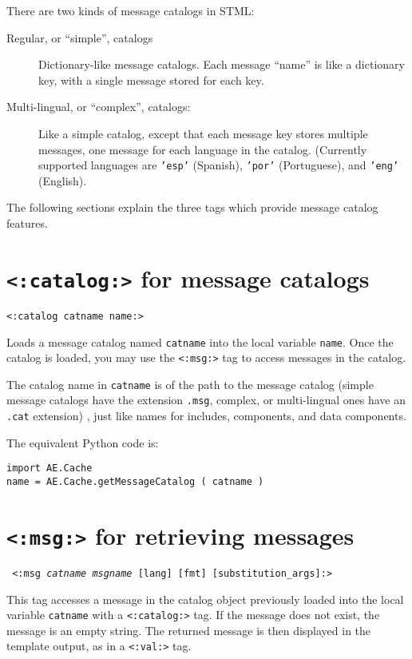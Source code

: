 \documentclass{manual}
\begin{document}
There are two kinds of message catalogs in STML:

\begin{description}
\item[Regular, or ``simple'', catalogs] Dictionary-like
message catalogs. Each message ``name'' is like a dictionary
key, with a single message stored for each key.

\item[Multi-lingual, or ``complex'', catalogs:] Like a
simple catalog, except that each message key stores
multiple messages, one message for each language in the
catalog. (Currently supported languages are \texttt{'esp'} (Spanish),
\texttt{'por'} (Portuguese), and \texttt{'eng'} (English). 
\end{description}

The following sections explain the three tags which
provide message catalog features.


\section{\texttt{<:catalog:>} for message catalogs}
\label{tagcatalog}

\texttt{<:catalog catname name:>}

Loads a  message catalog 
named \texttt{catname} into the local variable 
\texttt{name}. Once the catalog is loaded, you may
use the \texttt{<:msg:>} 
tag to access messages in the catalog.

The catalog name in \texttt{catname} is of the path to the message
catalog (simple message catalogs have the extension \texttt{.msg}, complex, or multi-lingual ones have an \texttt{.cat} extension)
, just like names for includes,
components, and data components.

The equivalent Python code is:
\begin{verbatim}
import AE.Cache
name = AE.Cache.getMessageCatalog ( catname )
\end{verbatim}


\section{\texttt{<:msg:>} for retrieving messages}
\label{tagmsg}

\texttt{
<:msg \emph{catname msgname} [lang] 
    [fmt] [substitution_args]:>
}

This tag accesses a message in the catalog object
previously loaded into the local variable \texttt{catname}
with a \texttt{<:catalog:>}
tag. If the message does not
exist, the message is an empty string. The returned message
is then displayed in the template output, as in a
\texttt{<:val:>}  tag.
\end{document}
